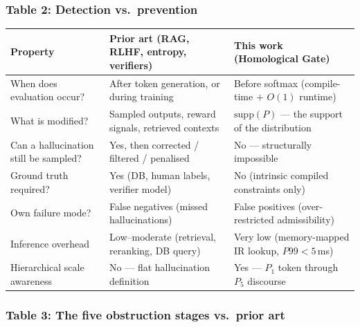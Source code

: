 \documentclass[11pt,a4paper]{article}
\begin{document}
\subsubsection*{Table 2: Detection vs.\ prevention}

\begin{center}
\renewcommand{\arraystretch}{1.3}\small
\begin{tabular}{p{4.2cm}p{4.5cm}p{4.5cm}}
\toprule
\textbf{Property} &
\textbf{Prior art} (RAG, RLHF, entropy, verifiers) &
\textbf{This work} (Homological Gate) \\
\midrule
When does evaluation occur? &
  After token generation, or during training &
  Before softmax (compile-time $+$ $O(1)$ runtime) \\
What is modified? &
  Sampled outputs, reward signals, retrieved contexts &
  $\mathrm{supp}(P)$ --- the support of the distribution \\
Can a hallucination still be sampled? &
  Yes, then corrected / filtered / penalised &
  No --- structurally impossible \\
Ground truth required? &
  Yes (DB, human labels, verifier model) &
  No (intrinsic compiled constraints only) \\
Own failure mode? &
  False negatives (missed hallucinations) &
  False positives (over-restricted admissibility) \\
Inference overhead &
  Low--moderate (retrieval, reranking, DB query) &
  Very low (memory-mapped IR lookup, $P99 < 5\,$ms) \\
Hierarchical scale awareness &
  No --- flat hallucination definition &
  Yes --- $P_1$ token through $P_5$ discourse \\
\bottomrule
\end{tabular}
\end{center}

\subsubsection*{Table 3: The five obstruction stages vs.\ prior art}
\end{document}
